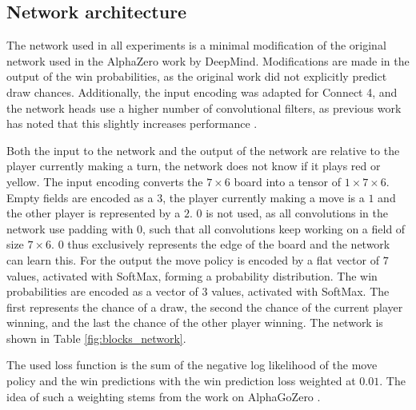 \documentclass[12pt,onecolumn,oneside,titlepage]{article}
\begin{document}
\subsection{Network architecture}

The network used in all experiments is a minimal modification of the original network used in the AlphaZero work by DeepMind. 
Modifications are made in the output of the win probabilities, as the original work did not explicitly predict draw chances. Additionally, the 
input encoding was adapted for Connect 4, and the network heads use a higher number of convolutional filters, as previous work has noted that this slightly increases performance \cite{oracledevs}.

Both the input to the network and the output of the network are relative to the player currently making a turn, the network does not know if it plays red or yellow.
The input encoding converts the $7\times6$ board into a tensor of $1\times7\times6$. 
Empty fields are encoded as a $3$, the player currently making a move is a $1$ and the other player is represented by a $2$. $0$ is not used, as all convolutions 
in the network use padding with $0$, such that all convolutions keep working on a field of size $7\times6$. $0$ thus exclusively represents the edge of the board and the network can learn this.
For the output the move policy is encoded by a flat vector of $7$ values, activated with SoftMax, forming a probability distribution.
The win probabilities are encoded as a vector of $3$ values, activated with SoftMax. 
The first represents the chance of a draw, the second the chance of the
current player winning, and the last the chance of the other player winning. The network is shown in Table \ref{fig:blocks_network}.

The used loss function is the sum of the negative log likelihood of the move policy and the win predictions with the win prediction loss weighted at $0.01$.
The idea of such a weighting stems from the work on AlphaGoZero \cite{silver2017mastering}. 
\end{document}
